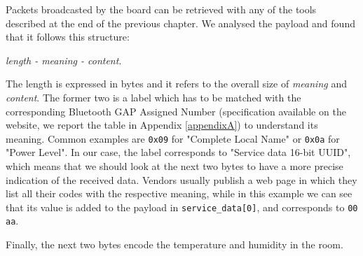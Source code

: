 Packets broadcasted by the board can be retrieved with any of the tools described at the end of the previous chapter. We analysed the payload and found that it follows this structure:
\begin{center}
	\textit{length - meaning - content}.
\end{center}
The length is expressed in bytes and it refers to the overall size of \textit{meaning} and \textit{content}. The former two is a label which has to be matched with the corresponding Bluetooth GAP Assigned Number (specification available on the website, we report the table in Appendix \ref{appendixA}) to understand its meaning. Common examples are \texttt{0x09} for "Complete Local Name" or \texttt{0x0a} for "Power Level". In our case, the label corresponds to "Service data 16-bit UUID", which means that we should look at the next two bytes to have a more precise indication of the received data. Vendors usually publish a web page in which they list all their codes with the respective meaning, while in this example we can see that its value is added to the payload in \texttt{service\_data[0]}, and corresponds to \texttt{00 aa}.

Finally, the next two bytes encode the temperature and humidity in the room.

